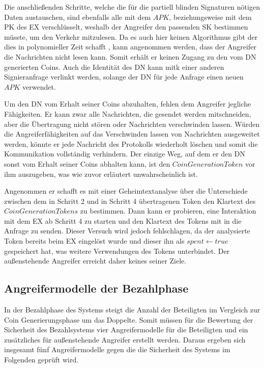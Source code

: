 \documentclass[
	fontsize=11pt,
	headings=small,
	parskip=half,           %
	bibliography=totoc,
	numbers=noenddot,       %
	open=any,               %
]{scrreprt}
\begin{document}
Die anschließenden Schritte, welche die für die partiell blinden Signaturen nötigen Daten austauschen, sind ebenfalls alle mit dem $APK$, beziehungsweise mit dem PK des EX verschlüsselt, weshalb der Angreifer den passenden SK bestimmen müsste, um den Verkehr mitzulesen. Da es auch hier keinen Algorithmus gibt der dies in polynomieller Zeit schafft \cite{ecc-bos2009security}, kann angenommen werden, dass der Angreifer die Nachrichten nicht lesen kann. Somit erhält er keinen Zugang zu den vom DN generierten Coins. Auch die Identität des DN kann mitk einer anderen Signieranfrage verlinkt werden, solange der DN für jede Anfrage einen neuen $APK$ verwendet.

Um den DN vom Erhalt seiner Coins abzuhalten, fehlen dem Angreifer jegliche Fähigkeiten. Er kann zwar alle Nachrichten, die gesendet werden mitschneiden, aber die Übertragung nicht stören oder Nachrichten verschwinden lassen. Würden die Angreiferfähigkeiten auf das Verschwinden lassen von Nachrichten ausgeweitet werden, könnte er jede Nachricht des Protokolls wiederholt löschen und somit die Kommunikation vollständig verhindern. Der einzige Weg, auf dem er den DN sonst vom Erhalt seiner Coins abhalten kann, ist den $CoinGenerationToken$ vor ihm auszugeben, was wie zuvor erläutert unwahrscheinlich ist.

Angenommen er schafft es mit einer Geheimtextanalyse über die Unterschiede zwischen dem in Schritt 2 und in Schritt 4 übertragenen Token den Klartext des $CoinGenerationTokens$ zu bestimmen. Dann kann er probieren, eine Interaktion mit dem EX ab Schritt 4 zu starten und den Klartext des Tokens mit in die Anfrage zu senden. Dieser Versuch wird jedoch fehlschlagen, da der analysierte Token bereits beim EX eingelöst wurde und dieser ihn als $spent\leftarrow true$ gespeichert hat, was weitere Verwendungen des Tokens unterbindet. Der außenstehende Angreifer erreicht daher keines seiner Ziele.

\subsection{Angreifermodelle der Bezahlphase}
\label{subsec:adversaryPayment}
In der Bezahlphase des Systems steigt die Anzahl der Beteiligten im Vergleich zur Coin Generierungsphase um das Doppelte. Somit müssen für die Bewertung der Sicherheit des Bezahlsystems vier Angreifermodelle für die Beteiligten und ein zusätzliches für außenstehende Angreifer erstellt werden. Daraus ergeben sich insgesamt fünf Angreifermodelle gegen die die Sicherheit des Systems im Folgenden geprüft wird.
\end{document}
